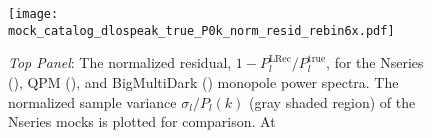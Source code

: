                                                                                                                                                                                                                                                                          \begin{figure}
                                                                                                                                                                                                                                                                         \begin{center}
                                                                                                                                                                                                                                                                         \texttt{[image: mock\_catalog\_dlospeak\_true\_P0k\_norm\_resid\_rebin6x.pdf]} 
                                                                                                                                                                                                                                                                         \caption{{\it Top Panel}: The normalized residual, 
                                                                                                                                                                                                                                                                         $1 - P_l^\mathrm{LRec}/P_l^\mathrm{true}$, 
                                                                                                                                                                                                                                                                         for the Nseries (\nseriescolor), QPM (\qpmcolor), and BigMultiDark (\bmdcolor)
                                                                                                                                                                                                                                                                         monopole power spectra. The normalized sample variance $\sigma_l / P_l(k)$ 
                                                                                                                                                                                                                                                                         (gray shaded region) of the Nseries mocks is plotted for comparison. At 
}
\end{center}
\end{figure}
